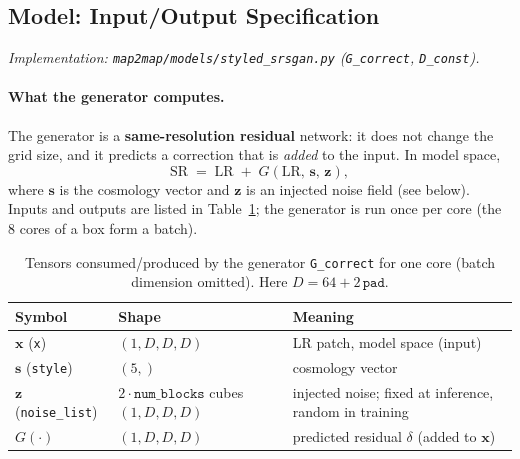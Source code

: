 \subsection{Model: Input/Output Specification}
\textit{Implementation: \texttt{map2map/models/styled\_srsgan.py}
(\texttt{G\_correct}, \texttt{D\_const}).}

\paragraph{What the generator computes.} The generator is a
\textbf{same-resolution residual} network: it does not change the grid size, and
it predicts a correction that is \emph{added} to the input. In model space,
\begin{equation}
  \mathrm{SR} \;=\; \mathrm{LR} \;+\; G(\mathrm{LR},\,\mathbf s,\,\mathbf z),
  \label{eq:srs-residual}
\end{equation}
where $\mathbf s$ is the cosmology vector and $\mathbf z$ is an injected noise
field (see below). Inputs and outputs are listed in
Table~\ref{tab:srs-model-io}; the generator is run once per core (the $8$ cores
of a box form a batch).

\begin{table}[t]
\centering
\caption{Tensors consumed/produced by the generator \texttt{G\_correct} for one
core (batch dimension omitted). Here $D=64{+}2\,\texttt{pad}$.}
\label{tab:srs-model-io}
\begin{tabular}{lll}
\toprule
Symbol & Shape & Meaning \\
\midrule
$\mathbf x$ (\texttt{x})       & $(1,D,D,D)$ & LR patch, model space (input) \\
$\mathbf s$ (\texttt{style})   & $(5,)$      & cosmology vector \\
$\mathbf z$ (\texttt{noise\_list}) & $2\cdot\texttt{num\_blocks}$ cubes $(1,D,D,D)$ & injected noise; fixed at inference, random in training \\
$G(\cdot)$                     & $(1,D,D,D)$ & predicted residual $\delta$ (added to $\mathbf x$) \\
\bottomrule
\end{tabular}
\end{table}

